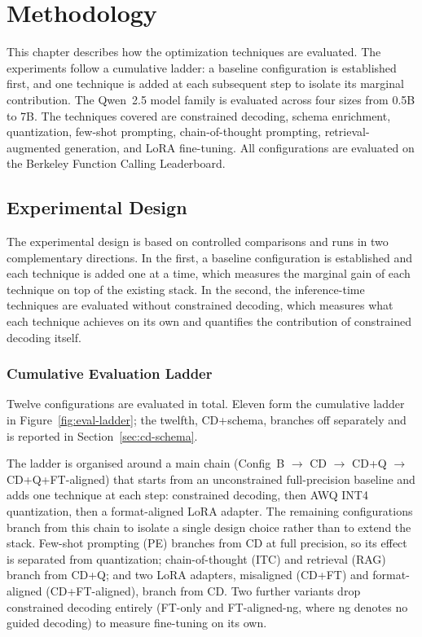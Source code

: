 \chapter{Methodology} \label{ch:methodology}

This chapter describes how the optimization techniques are evaluated. The
experiments follow a cumulative ladder: a baseline configuration is established
first, and one technique is added at each subsequent step to isolate its
marginal contribution. The Qwen~2.5 model family is evaluated across four
sizes from 0.5B to 7B. The techniques covered are constrained decoding, schema
enrichment, quantization, few-shot prompting, chain-of-thought prompting,
retrieval-augmented generation, and LoRA fine-tuning. All configurations are
evaluated on the Berkeley Function Calling Leaderboard.

\section{Experimental Design}

The experimental design is based on controlled comparisons and runs in two
complementary directions. In the first, a baseline configuration is established
and each technique is added one at a time, which measures the marginal gain of
each technique on top of the existing stack. In the second, the inference-time
techniques are evaluated without constrained decoding, which measures what each
technique achieves on its own and quantifies the contribution of constrained
decoding itself.

\subsection{Cumulative Evaluation Ladder}

Twelve configurations are evaluated in total. Eleven form the cumulative
ladder in Figure~\ref{fig:eval-ladder}; the twelfth, CD+schema, branches off
separately and is reported in Section~\ref{sec:cd-schema}.

The ladder is organised around a main chain (Config~B $\to$ CD $\to$ CD+Q
$\to$ CD+Q+FT-aligned) that starts from an unconstrained full-precision
baseline and adds one technique at each step: constrained decoding, then
AWQ INT4 quantization, then a format-aligned LoRA adapter. The remaining
configurations branch from this chain to isolate a single design choice
rather than to extend the stack. Few-shot prompting (PE) branches from CD at
full precision, so its effect is separated from quantization; chain-of-thought
(ITC) and retrieval (RAG) branch from CD+Q; and two LoRA adapters, misaligned
(CD+FT) and format-aligned (CD+FT-aligned), branch from CD\@. Two further
variants drop constrained decoding entirely (FT-only and FT-aligned-ng, where
ng denotes no guided decoding) to measure fine-tuning on its own.

